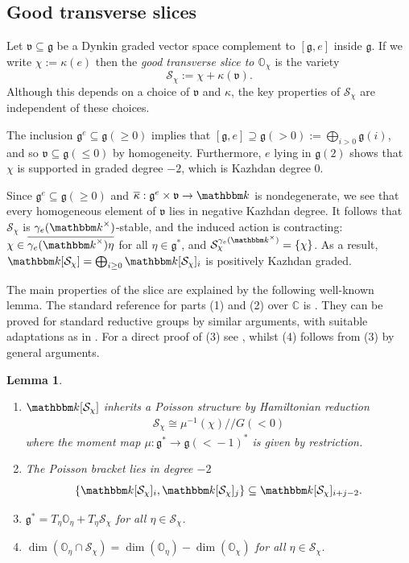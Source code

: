 \documentclass[twoside,12pt,reqno]{amsart}
\newtheorem{Lemma}[Theorem]{Lemma}
\theoremstyle{remark}
\numberwithin{equation}{section}
\def\bar{\overline}
\def\k{{\mathbbm k}}
\def\C{{\mathbb C}}
\def\O{{\mathbb O}}
\def\g{{\mathfrak g}}
\def\v{\mathfrak{v}}
\renewcommand{\S}{\mathcal{S}}
\begin{document}
\subsection{Good transverse slices}

Let $\v \subseteq \g$ be a Dynkin graded vector space complement to $[\g,e]$ inside $\g$. If we write $\chi := \kappa(e)$ then the {\it good transverse slice to $\O_\chi$} is the variety
$$\S_\chi := \chi + \kappa(\v).$$
Although this depends on a choice of $\v$ and $\kappa$, the key properties of $\S_\chi$ are independent of these choices.


The inclusion $\g^e\subseteq \g(\geq0)$ implies that $[\g,e] \supseteq \g(>0) := \bigoplus_{i>0} \g(i)$, and so $\v \subseteq \g(\le 0)$ by homogeneity. Furthermore, $e$ lying in $\g(2)$ shows that $\chi$ is supported in graded degree $-2$, which is Kazhdan degree $0$. 

Since $\g^e\subseteq \g(\geq0)$ and  $\bar\kappa : \g^e \times \v \to \k$ is nondegenerate, we see that every homogeneous element of $\v$ lies in negative Kazhdan degree. 
It follows that $\S_\chi$ is $\gamma_e(\k^\times)$-stable, and the induced action is contracting: $\chi \in \overline{\gamma_e(\k^\times) \eta}$ for all $\eta \in \g^*$, and $\S_\chi^{\gamma_e(\k^\times)} = \{ \chi \}$.
As a result, $\k[\S_\chi] = \bigoplus_{i \ge 0} \k[\S_\chi]_i$ is positively Kazhdan graded.

The main properties of the slice are explained by the following well-known lemma. The standard reference for parts (1) and (2) over $\C$ is \cite[]{GG}. They can be proved for standard reductive groups by similar arguments, with suitable adaptations as in \cite[]{GTmodular}. For a direct proof of (3) see \cite[Corollary 3.24]{Ta}, whilst (4) follows from (3) by general arguments.

\begin{Lemma}
\label{L:sliceproperties}
\begin{enumerate}
\setlength{\itemsep}{4pt}
\item $\k[\S_\chi]$ inherits a Poisson structure by Hamiltonian reduction
\begin{eqnarray*}
\S_\chi \cong \mu^{-1}(\chi) /\!\!/ G(<0)
\end{eqnarray*}
where the moment map $\mu : \g^* \to \g(<\!\!-1)^*$ is given by restriction.
\item The Poisson bracket lies in degree $-2$ 
$$\{\k[\S_\chi]_i , \k[\S_\chi]_j\} \subseteq \k[\S_\chi]_{i+j-2}.$$
\item $\g^* = T_\eta \O_\eta + T_\eta\S_\chi$ for all $\eta \in \S_\chi$.
\item $\dim (\O_\eta \cap \S_\chi) = \dim(\O_\eta) - \dim(\O_\chi)$ for all $\eta \in \S_\chi$.
\end{enumerate} 
\end{Lemma}
\end{document}
